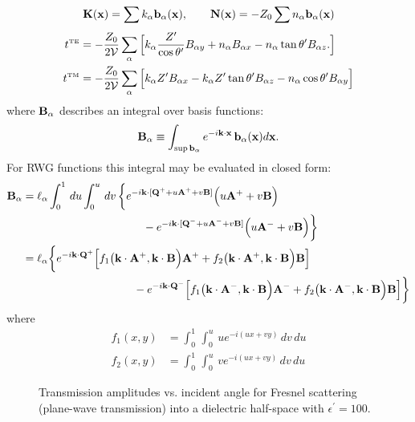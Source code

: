 \documentclass[letterpaper]{article}
\begin{document}
$$ \mathbf{K}(\mathbf{x})=\sum k_\alpha \mathbf{b}_\alpha(\mathbf{x}), \qquad 
   \mathbf{N}(\mathbf{x})=-Z_0 \sum n_\alpha \mathbf{b}_\alpha(\mathbf{x})
$$
\begin{align*}
 t^{\hbox{\tiny{TE}}}
&=-\frac{Z_0}{2\mathcal{V}} \sum_{\alpha}
   \Big[ k_\alpha \frac{Z^\prime}{\cos\theta^\prime} B_{\alpha y}
        +n_\alpha B_{\alpha x} - n_\alpha \tan\theta^\prime B_{\alpha z}.
   \Big]
\\
 t^{\hbox{\tiny{TM}}}
&=-\frac{Z_0}{2\mathcal{V}} \sum_{\alpha}
   \Big[ k_\alpha Z^\prime B_{\alpha x}
        -k_\alpha Z^\prime \tan\theta^\prime B_{\alpha z}
        -n_\alpha \cos\theta^\prime B_{\alpha y}
   \Big]
\end{align*}
where $\mathbf{B}_\alpha$ describes an integral over basis functions:
$$ \mathbf{B}_\alpha
   \equiv 
   \int_{\sup \mathbf{b}_\alpha}
   e^{-i\mathbf{k} \cdot \mathbf{x}} \, \mathbf{b}_\alpha(\mathbf{x})d\mathbf{x}.
$$
For RWG functions this integral may be evaluated in closed form:
\begin{align*}
 \mathbf{B}_\alpha
&=\ell_\alpha
  \int_0^1 \, du \int_0^u \, dv \,
  \bigg\{
  e^{-i\mathbf{k}\cdot [\mathbf{Q}^+ + u \mathbf{A}^+ + v\mathbf{B}]}
  \Big(u\mathbf{A}^+ + v\mathbf{B}\Big)
\\ 
  &\hspace{1.5in}
  - 
  e^{-i\mathbf{k}\cdot [\mathbf{Q}^- + u \mathbf{A}^- + v\mathbf{B}]}
  \Big(u\mathbf{A}^- + v\mathbf{B}\Big)
  \bigg\}
\\
&=\ell_\alpha\bigg\{ 
  e^{-i\mathbf{k} \cdot \mathbf{Q}^+} 
  \Big[ f_1\big(\mathbf{k}\cdot \mathbf{A}^+, \mathbf{k}\cdot \mathbf{B}\Big) \mathbf{A}^+
       +f_2\big(\mathbf{k}\cdot \mathbf{A}^+, \mathbf{k}\cdot \mathbf{B}\Big) \mathbf{B}
  \Big]
\\
&\qquad \qquad\qquad\qquad\qquad
  -
  e^{-i\mathbf{k} \cdot \mathbf{Q}^-} 
  \Big[ f_1\big(\mathbf{k}\cdot \mathbf{A}^-, \mathbf{k}\cdot \mathbf{B}\Big) \mathbf{A}^-
       +f_2\big(\mathbf{k}\cdot \mathbf{A}^-, \mathbf{k}\cdot \mathbf{B}\Big) \mathbf{B}
  \Big]\bigg\}
\\
\end{align*}
where
\begin{align*}
 f_1(x, y)&=\int_0^1 \, \int_0^u \, u e^{-i (ux + vy)} \,dv\,du  
\\
 f_2(x, y)&=\int_0^1 \, \int_0^u \, v e^{-i (ux + vy)} \,dv\,du  
\end{align*}

\newpage

\begin{figure}[H]
\begin{center}
\caption{Transmission amplitudes vs. incident angle 
         for Fresnel scattering (plane-wave transmission) 
         into a dielectric half-space with $\epsilon^\prime=100.$
        }
\label{PendulumFigure}
\end{center}
\end{figure}
\end{document}
